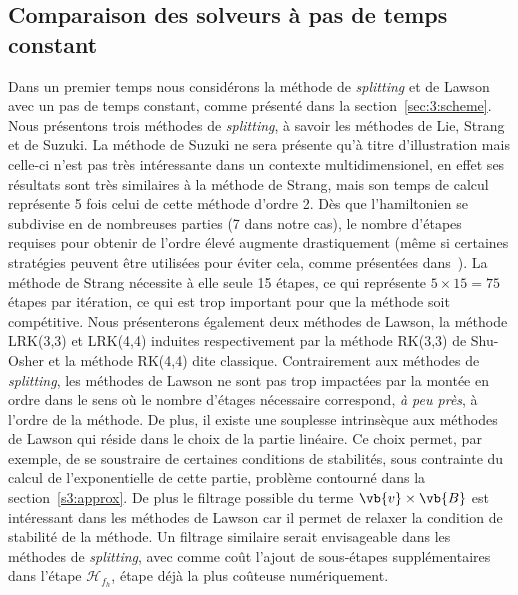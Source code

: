 
\FloatBarrier
\subsection{Comparaison des solveurs à pas de temps constant}

Dans un premier temps nous considérons la méthode de \emph{splitting} et de Lawson avec un pas de temps constant, comme présenté dans la section~\ref{sec:3:scheme}. Nous présentons trois méthodes de \emph{splitting}, à savoir les méthodes de Lie, Strang et de Suzuki. La méthode de Suzuki ne sera présente qu'à titre d'illustration mais celle-ci n'est pas très intéressante dans un contexte multidimensionel, en effet ses résultats sont très similaires à la méthode de Strang, mais son temps de calcul représente 5 fois celui de cette méthode d'ordre 2. Dès que l'hamiltonien se subdivise en de nombreuses parties (7 dans notre cas), le nombre d'étapes requises pour obtenir de l'ordre élevé augmente drastiquement (même si certaines stratégies peuvent être utilisées pour éviter cela, comme présentées dans~\cite{Casas:2017}). La méthode de Strang nécessite à elle seule 15 étapes, ce qui représente $5\times15=75$ étapes par itération, ce qui est trop important pour que la méthode soit compétitive. Nous présenterons également deux méthodes de Lawson, la méthode LRK(3,3) et LRK(4,4) induites respectivement par la méthode RK(3,3) de Shu-Osher et la méthode RK(4,4) dite classique. Contrairement aux méthodes de \emph{splitting}, les méthodes de Lawson ne sont pas trop impactées par la montée en ordre dans le sens où le nombre d'étages nécessaire correspond, \emph{à peu près}, à l'ordre de la méthode. De plus, il existe une souplesse intrinsèque aux méthodes de Lawson qui réside dans le choix de la partie linéaire. Ce choix permet, par exemple, de se soustraire de certaines conditions de stabilités, sous contrainte du calcul de l'exponentielle de cette partie, problème contourné dans la section~\ref{s3:approx}. De plus le filtrage possible du terme $\vb{v}\times\vb{B}$ est intéressant dans les méthodes de Lawson car il permet de relaxer la condition de stabilité de la méthode. Un filtrage similaire serait envisageable dans les méthodes de \emph{splitting}, avec comme coût l'ajout de sous-étapes supplémentaires dans l'étape $\mathcal{H}_{f_h}$, étape déjà la plus coûteuse numériquement.

